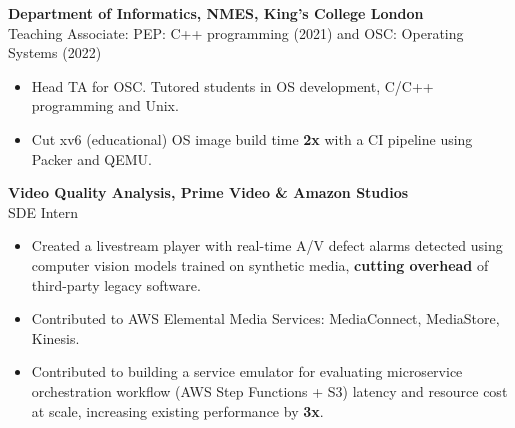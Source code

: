 \documentclass[11pt,a4paper]{article}
\newcommand{\years}[1]{\marginnote{\footnotesize\myfont #1}} %
\begin{document}
\years{2021-22} \textbf{Department of Informatics, NMES, King's College London} \\
    Teaching Associate: PEP: C++ programming (2021) and OSC: Operating Systems (2022) 
    \begin{itemize}[itemsep=-1mm,topsep=0pt,partopsep=0pt,leftmargin=5mm]
     \item Head TA for OSC. Tutored students in OS development, C/C++ programming and Unix.
     \item Cut xv6 (educational) OS image build time \textbf{2x} with a CI pipeline using Packer and QEMU.\medskip
    \end{itemize}
    \years{2021-21} \textbf{Video Quality Analysis, Prime Video \& Amazon Studios} \\
    SDE Intern \vspace{1pt}
    \begin{itemize}[itemsep=-1mm,topsep=0pt,partopsep=0pt,leftmargin=5mm]
     \item Created a livestream player with real-time A/V defect alarms detected using computer vision models trained on synthetic media, \textbf{cutting overhead} of third-party legacy software.
     \item Contributed to AWS Elemental Media Services: MediaConnect, MediaStore, Kinesis.
     \item Contributed to building a service emulator for evaluating microservice orchestration workflow (AWS Step Functions + S3) latency and resource cost at scale, increasing existing performance by \textbf{3x}.\medskip
    \end{itemize}
\end{document}
